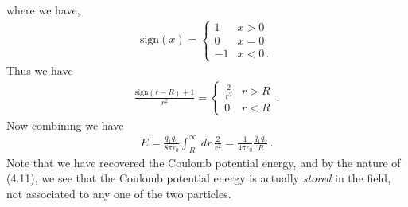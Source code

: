 \documentclass[11pt, onesided]{book}
\theoremstyle{break}
\theoremstyle{break}
\begin{document}
where we have,
\begin{align*}
\text{sign}(x) = \begin{cases}
1 & x>0\\
0 & x= 0\\
-1 & x<0\,.
\end{cases}
\end{align*}
Thus we have
\begin{align*}
\frac{\text{sign}(r-R)+1}{r^2} = \begin{cases}
\frac{2}{r^2}& r>R\\
0 & r<R
\end{cases}\,.
\end{align*}
Now combining we have
\begin{align*}
E =  \frac{q_1q_2}{8\pi \epsilon_0}\int_R^\infty \, dr\, \frac{2}{r^2} = \frac{1}{4\pi \epsilon_0}\frac{q_1q_2}{R}\,.
\end{align*}
Note that we have recovered the Coulomb potential energy, and by the nature of (4.11), we see that the Coulomb potential energy is actually \textit{stored} in the field, not associated to any one of the two particles.\\
\end{document}
